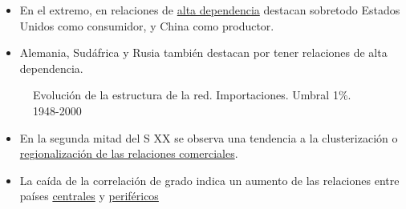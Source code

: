 \documentclass[compress]{beamer}
\begin{document}
\begin{frame}

\begin{itemize}
	\item[\faRebel] En el extremo, en relaciones de \underline{alta dependencia} destacan sobretodo Estados Unidos como consumidor, y China como productor.
	\item[\faRebel] Alemania, Sudáfrica y Rusia también destacan por tener relaciones de alta dependencia. 
\end{itemize}
\end{frame}



\begin{frame}
\begin{figure}
	
	\centering
	\caption*{\scriptsize Evolución de la estructura de la red. Importaciones. Umbral 1\%. 1948-2000}
	\label{fig:metricas_LP}
\end{figure}

\small
\begin{itemize}[label=\faRebel]
	\item En la segunda mitad del S XX se observa una tendencia a la clusterización o \underline{regionalización de las relaciones comerciales}.
	\item La caída de la correlación de grado indica un aumento de las relaciones entre países \underline{centrales} y \underline{periféricos}
\end{itemize}


\end{frame}
\end{document}

